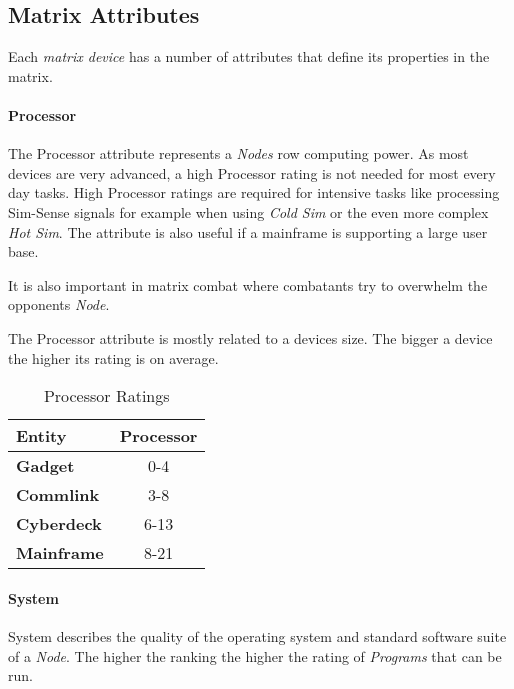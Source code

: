 \subsection{Matrix Attributes}

Each \emph{matrix device} has a number of attributes that define its properties in the matrix.

\paragraph{Processor}

The Processor attribute represents a \emph{Nodes} row computing power. As most
devices are very advanced, a high Processor rating is not needed for most every
day tasks. High Processor ratings are required for intensive tasks like processing
Sim-Sense signals for example when using \emph{Cold Sim} or the even more complex
\emph{Hot Sim}. The attribute is also useful if a mainframe is supporting a large
user base.

It is also important in matrix combat where combatants try to overwhelm
the opponents \emph{Node}.

\hfill

The Processor attribute is mostly related to a devices size. The bigger a device
the higher its rating is on average.

\begin{table}[htb]
    \caption[Processor Ratings]{Processor Ratings}
    \label{tab:processor ratings}
    \centering
    \begin{tabular}{lc}
        \toprule
        \textbf{Entity}    & \textbf{Processor} \\
        \midrule
        \textbf{Gadget}    & 0-4                \\
        \textbf{Commlink}  & 3-8                \\
        \textbf{Cyberdeck} & 6-13               \\
        \textbf{Mainframe} & 8-21               \\
        \bottomrule
    \end{tabular}
\end{table}


\paragraph{System}

System describes the quality of the operating system and standard software
suite of a \emph{Node}. The higher the ranking the higher the rating of
\emph{Programs} that can be run.

